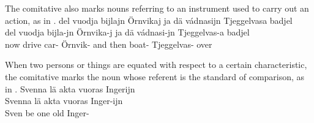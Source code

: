The comitative also marks nouns referring to an instrument used to carry out an action, as in .
\ea\label{com2}
\glll	del vuodja {bijlajn} Örnvikaj ja dä {vádnasijn} Tjeggelvasa badjel\\
	del vuodja bijla-jn Örnvika-j ja dä vádnasi-jn Tjeggelvas-a badjel\\
	now drive\BS{} car- Örnvik- and then boat- Tjeggelvas- over\\\nopagebreak
{} 
\z

When two persons or things are equated with respect to a certain characteristic, the comitative marks the noun whose referent is the standard of comparison, as in .
\ea\label{com3}
\glll	Svenna lä akta vuoras {Ingerijn}\\
	Svenna lä akta vuoras Inger-ijn\\
	Sven\BS{} be\BS{} one old Inger-\\\nopagebreak
{} 
\z


